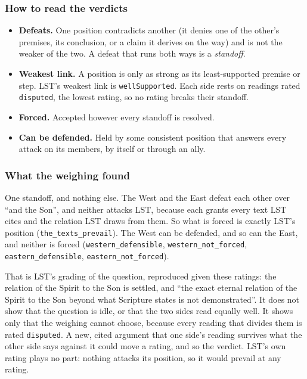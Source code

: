 \documentclass[11pt,paper=\testimonypaper,DIV=13,parskip=false]{scrartcl}
\begin{document}
\subsubsection*{How to read the verdicts}
\begin{itemize}
  \item \textbf{Defeats.} One position contradicts another (it denies one of the other’s premises, its conclusion, or a claim it derives on the way) and is not the weaker of the two. A defeat that runs both ways is a \emph{standoff}.
  \item \textbf{Weakest link.} A position is only as strong as its least-supported premise or step. LST’s weakest link is \texttt{well\allowbreak{}Supported}. Each side rests on readings rated \texttt{disputed}, the lowest rating, so no rating breaks their standoff.
  \item \textbf{Forced.} Accepted however every standoff is resolved.
  \item \textbf{Can be defended.} Held by some consistent position that answers every attack on its members, by itself or through an ally.
\end{itemize}
\subsubsection*{What the weighing found}
One standoff, and nothing else. The West and the East defeat each other over “and the Son”, and neither attacks LST, because each grants every text LST cites and the relation LST draws from them. So what is forced is exactly LST’s position (\texttt{the\_\allowbreak{}texts\_\allowbreak{}prevail}). The West can be defended, and so can the East, and neither is forced (\texttt{western\_\allowbreak{}defensible}, \texttt{western\_\allowbreak{}not\_\allowbreak{}forced}, \texttt{eastern\_\allowbreak{}defensible}, \texttt{eastern\_\allowbreak{}not\_\allowbreak{}forced}).

That is LST’s grading of the question, reproduced given these ratings: the relation of the Spirit to the Son is settled, and “the exact eternal relation of the Spirit to the Son beyond what Scripture states is not demonstrated”. It does not show that the question is idle, or that the two sides read equally well. It shows only that the weighing cannot choose, because every reading that divides them is rated \texttt{disputed}. A new, cited argument that one side’s reading survives what the other side says against it could move a rating, and so the verdict. LST’s own rating plays no part: nothing attacks its position, so it would prevail at any rating.
\end{document}
